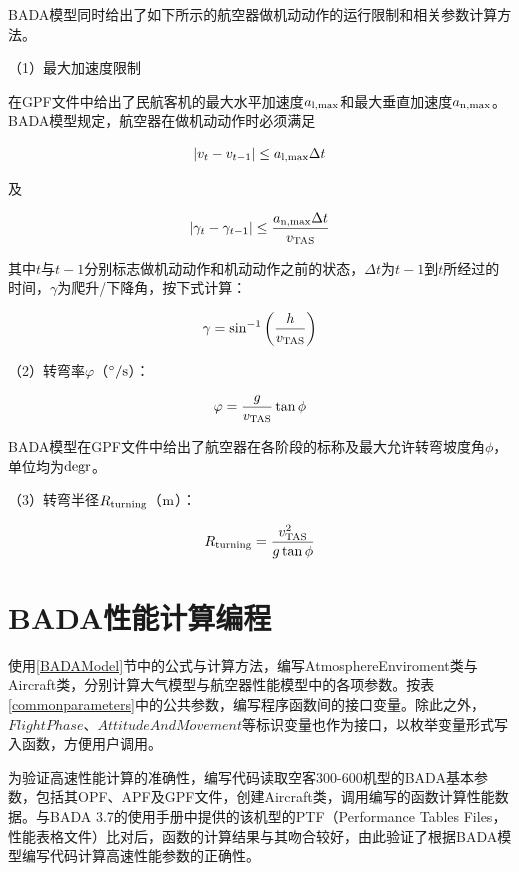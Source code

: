 \documentclass[a4paper,punct,space,heading=true,AutoFakeBold]{ctexrep}
\begin{document}
BADA模型同时给出了如下所示的航空器做机动动作的运行限制和相关参数计算方法。

（1）最大加速度限制

在GPF文件中给出了民航客机的最大水平加速度$a_{\rm l,max}$和最大垂直加速度$a_{\rm n,max}$。BADA模型规定，航空器在做机动动作时必须满足

\begin{equation}
\left|v_t-v_{t-1}\right|\leq a_{\rm l,max}\Delta t
\end{equation}

及

\begin{equation}
\left|\gamma_t-\gamma_{t-1}\right|\leq \frac{a_{\rm n,max}\Delta t}{v_{\rm TAS}}
\end{equation}

其中$t$与$t-1$分别标志做机动动作和机动动作之前的状态，$\Delta t$为$t-1$到$t$所经过的时间，$\gamma$为爬升/下降角，按下式计算：

\begin{equation}
\gamma=\sin^{-1}\left(\frac{h}{v_{\rm TAS}}\right)
\end{equation}

（2）转弯率$\varphi$（$\rm ^\circ/s$）：

\begin{equation}
\varphi=\frac{g}{v_{\rm TAS}}\tan\phi
\end{equation}

BADA模型在GPF文件中给出了航空器在各阶段的标称及最大允许转弯坡度角$\phi$，单位均为$\rm degr$。

（3）转弯半径$R_{\rm turning}$（$\rm m$）：

\begin{equation}
R_{\rm turning}=\frac{v_{\rm TAS}^2}{g\tan\phi}
\end{equation}



\section{BADA性能计算编程}

使用\ref{BADAModel}节中的公式与计算方法，编写AtmosphereEnviroment类与Aircraft类，分别计算大气模型与航空器性能模型中的各项参数。按表\ref{commonparameters}中的公共参数，编写程序函数间的接口变量。除此之外，$FlightPhase$、$AttitudeAndMovement$等标识变量也作为接口，以枚举变量形式写入函数，方便用户调用。

为验证高速性能计算的准确性，编写代码读取空客300-600机型的BADA基本参数，包括其OPF、APF及GPF文件，创建Aircraft类，调用编写的函数计算性能数据。与BADA 3.7的使用手册中提供的该机型的PTF（Performance Tables Files，性能表格文件）比对后，函数的计算结果与其吻合较好，由此验证了根据BADA模型编写代码计算高速性能参数的正确性。
\end{document}
